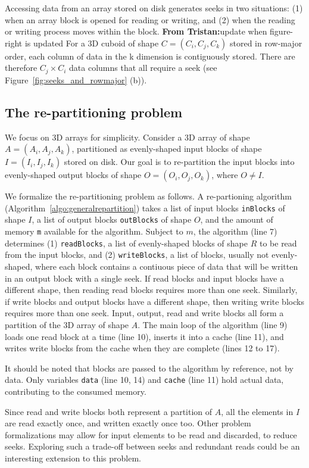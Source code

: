 \documentclass[sigconf, nonacm]{acmart}
\newcommand{\tristan}[1]{\color{orange}\textbf{From Tristan:}#1\color{black}}
\begin{document}
Accessing data from an array stored on disk generates seeks in two
situations: (1) when an array block is opened for reading or writing, and (2)
when the reading or writing process moves within the block. 
\tristan{update when figure-right is updated} For a 3D cuboid of shape $C = (C_i, C_j, C_k)$ stored
in row-major order, each column of data in the k dimension is contiguously
stored. There are therefore $C_j \times C_i$ data columns that all require a
seek (see Figure~\ref{fig:seeks_and_rowmajor} (b)).

\subsection{The re-partitioning problem}
We focus on 3D arrays for simplicity. Consider a 3D array of shape $A =
(A_i, A_j, A_k)$, partitioned as evenly-shaped input blocks of shape $I = (I_i,
I_j, I_k)$ stored on disk. Our goal is to re-partition the input blocks into
evenly-shaped output blocks of shape $O = (O_i, O_j, O_k)$, where $O \neq I$.

We formalize the re-partitioning problem as follows.
A re-partioning algorithm (Algorithm~\ref{algo:generalrepartition}) takes a
list of input blocks \texttt{inBlocks} of shape $I$, a list of output
blocks \texttt{outBlocks} of shape $O$, and the amount of memory \texttt{m}
available for the algorithm. Subject to $m$, the algorithm (line 7) determines (1)
\texttt{readBlocks}, a list of evenly-shaped blocks of shape $R$ to be read from the
input blocks, and (2) \texttt{writeBlocks}, a list of blocks,
usually not evenly-shaped, where each block contains a contiuous piece of
data that will be written in an output block with a single seek.
If read blocks and input blocks have a different shape, then reading read blocks requires
more than one seek. Similarly, if write blocks and output blocks have a different shape,
then writing write blocks requires more than one seek. Input, output, read
and write blocks all form a partition of the 3D array of shape $A$. The
main loop of the algorithm (line 9) loads one read block at a time (line
10), inserts it into a cache (line 11), and writes write blocks from the
cache when they are complete (lines 12 to 17).

It should be noted that blocks are passed to the algorithm by reference,
not by data. Only variables \texttt{data} (line 10, 14) and \texttt{cache}
(line 11) hold actual data, contributing to the consumed memory. 

Since read and write blocks both represent a partition of $A$, all the
elements in $I$ are read exactly once, and written exactly once too. Other
problem formalizations may allow for input elements to be read and
discarded, to reduce seeks. Exploring such a trade-off
between seeks and redundant reads could be an interesting extension to this problem.
\end{document}
